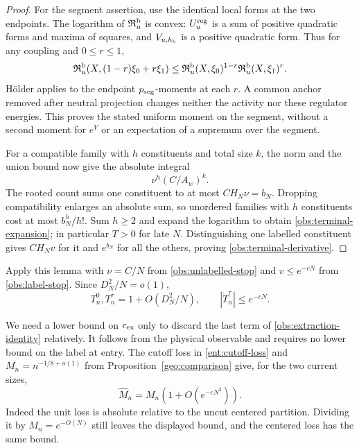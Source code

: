 \begin{proof}
For the segment assertion, use the identical local forms at the
two endpoints.  The logarithm of \(\mathfrak R_u^{\rm b}\) is convex:
\(U_u^{\rm reg}\) is a sum of positive quadratic forms and maxima
of squares, and \(V_{u,h_{\rm b}}\) is a positive quadratic form.
Thus for any coupling and \(0\le r\le1\),
\[
 \mathfrak R_u^{\rm b}(X,(1-r)\xi_0+r\xi_1)
 \le \mathfrak R_u^{\rm b}(X,\xi_0)^{1-r}
       \mathfrak R_u^{\rm b}(X,\xi_1)^r.
\]
H\"older applies to the endpoint \(p_{\rm seg}\)-moments at each
\(r\).  A common anchor removed after neutral projection changes
neither the activity nor these regulator energies.  This proves the
stated uniform moment on the segment, without a second moment for
\(e^V\) or an expectation of a supremum over the segment.

For a compatible family with \(h\) constituents and total size
\(k\), the norm and the union bound now give the absolute integral
\[
                         \nu^h(C/A_w)^k.
\]
The rooted count \cite[Lemma~4.3]{B} sums one constituent to at most
\(CH_N\nu=b_N\).  Dropping compatibility enlarges an absolute sum,
so unordered families with \(h\) constituents cost at most
\(b_N^h/h!\).  Sum \(h\ge2\) and expand the logarithm to obtain
\eqref{obs:terminal-expansion}; in particular \(T>0\) for late
\(N\).  Distinguishing one labelled constituent gives \(CH_Nv\)
for it and \(e^{b_N}\) for all the others, proving
\eqref{obs:terminal-derivative}.
\end{proof}

Apply this lemma with \(\nu=C/N\) from
\eqref{obs:unlabelled-stop} and \(v\le e^{-cN}\) from
\eqref{obs:label-stop}.  Since \(D_N^2/N=o(1)\),
\begin{equation}\label{obs:terminal-near-one}
 T_n^0,T_n^\tau=1+O(D_N^2/N),\qquad
                 |\dot T_n^\tau|\le e^{-cN}.
\end{equation}

We need a lower bound on \(c_{\rm ex}\) only to discard the last
term of \eqref{obs:extraction-identity} relatively.  It follows
from the physical observable and requires no lower bound on the
label at entry.  The cutoff loss in \eqref{ent:cutoff-loss} and
\(M_n=n^{-1/8+o(1)}\) from Proposition~\ref{geo:comparison} give,
for the two current sizes,
\begin{equation}\label{obs:cutoff-relative}
                   \widehat M_n=M_n(1+O(e^{-cN^2})).
\end{equation}
Indeed the unit loss is absolute relative to the uncut centered
partition.  Dividing it by \(M_n=e^{-O(N)}\) still leaves the
displayed bound, and the centered loss has the same bound.

